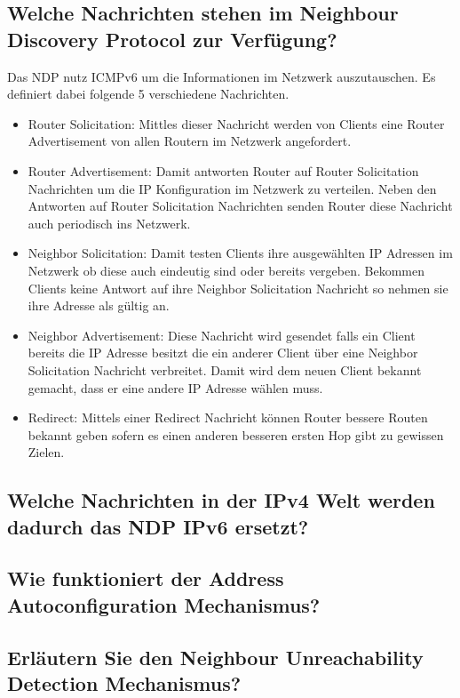 \documentclass[a4paper,12pt]{article} %
\begin{document}
\subsection{Welche Nachrichten stehen im Neighbour Discovery Protocol zur Verfügung?}
Das NDP nutz ICMPv6 um die Informationen im Netzwerk auszutauschen. Es definiert dabei folgende 5 verschiedene Nachrichten.
\begin{itemize}
\item Router Solicitation: Mittles dieser Nachricht werden von Clients eine Router Advertisement von allen Routern im Netzwerk angefordert.
\item Router Advertisement: Damit antworten Router auf Router Solicitation Nachrichten um die IP Konfiguration im Netzwerk zu verteilen. Neben den Antworten auf Router Solicitation Nachrichten senden Router diese Nachricht auch periodisch ins Netzwerk.
\item Neighbor Solicitation: Damit testen Clients ihre ausgewählten IP Adressen im Netzwerk ob diese auch eindeutig sind oder bereits vergeben. Bekommen Clients keine Antwort auf ihre Neighbor Solicitation Nachricht so nehmen sie ihre Adresse als gültig an.
\item Neighbor Advertisement: Diese Nachricht wird gesendet falls ein Client bereits die IP Adresse besitzt die ein anderer Client über eine Neighbor Solicitation Nachricht verbreitet. Damit wird dem neuen Client bekannt gemacht, dass er eine andere IP Adresse wählen muss.
\item Redirect: Mittels einer Redirect Nachricht können Router bessere Routen bekannt geben sofern es einen anderen besseren ersten Hop gibt zu gewissen Zielen.
\end{itemize}

\subsection{Welche Nachrichten in der IPv4 Welt werden dadurch das NDP IPv6 ersetzt?}

\subsection{Wie funktioniert der Address Autoconfiguration Mechanismus?}

\subsection{Erläutern Sie den Neighbour Unreachability Detection Mechanismus?}
\end{document}
